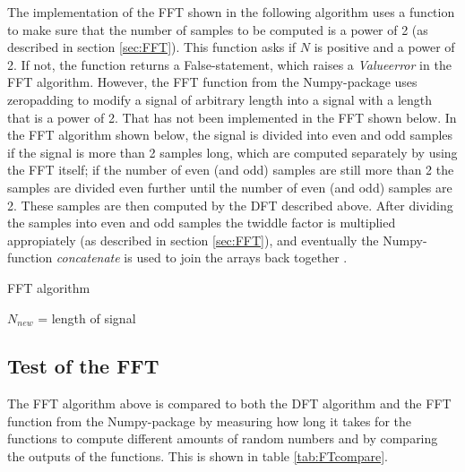 The implementation of the FFT shown in the following algorithm uses a function to make sure that the number of samples to be computed is a power of 2 (as described in section \ref{sec:FFT}). This function asks if $N$ is positive and a power of 2. If not, the function returns a False-statement, which raises a \textit{Valueerror} in the FFT algorithm. However, the FFT function from the Numpy-package uses zeropadding to modify a signal of arbitrary length into a signal with a length that is a power of 2. That has not been implemented in the FFT shown below. In the FFT algorithm shown below, the signal is divided into even and odd samples if the signal is more than 2 samples long, which are computed separately by using the FFT itself; if the number of even (and odd) samples are still more than 2 the samples are divided even further until the number of even (and odd) samples are 2. These samples are then computed by the DFT described above. After dividing the samples into even and odd samples the twiddle factor is multiplied appropiately (as described in section \ref{sec:FFT}), and eventually the Numpy-function \textit{concatenate} is used to join the arrays back together .
\begin{algorithm}
\caption{FFT algorithm}
\label{FFTalg}
\begin{algorithmic}[1]

\EndProcedure

	\State $N_{new}$ = length of signal 
	\Else
		 
		 
		 
	\EndIf
\EndProcedure
\end{algorithmic}
\end{algorithm}

\subsection{Test of the FFT}
The FFT algorithm above is compared to both the DFT algorithm and the FFT function from the Numpy-package by measuring how long it takes for the functions to compute different amounts of random numbers and by comparing the outputs of the functions. This is shown in table \ref{tab:FTcompare}.

